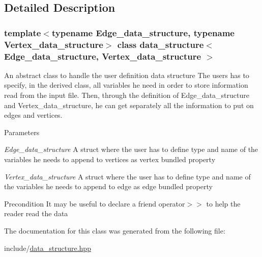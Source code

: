 \subsection{Detailed Description}
\subsubsection*{template$<$typename Edge\_\-data\_\-structure, typename Vertex\_\-data\_\-structure$>$ class data\_\-structure$<$ Edge\_\-data\_\-structure, Vertex\_\-data\_\-structure $>$}

An abstract class to handle the user definition data structure  The users has to specify, in the derived class, all variables he need in order to store information read from the input file. Then, through the definition of Edge\_\-data\_\-structure and Vertex\_\-data\_\-structure, he can get separately all the information to put on edges and vertices. 
\begin{DoxyParams}{Parameters}
\item[{\em Edge\_\-data\_\-structure}]A struct where the user has to define type and name of the variables he needs to append to vertices as vertex bundled property \item[{\em Vertex\_\-data\_\-structure}]A struct where the user has to define type and name of the variables he needs to append to edge as edge bundled property \end{DoxyParams}
\begin{DoxyPrecond}{Precondition}
It may be useful to declare a friend operator$>$$>$ to help the reader read the data 
\end{DoxyPrecond}


The documentation for this class was generated from the following file:\begin{DoxyCompactItemize}
\item 
include/\hyperlink{data__structure_8hpp}{data\_\-structure.hpp}\end{DoxyCompactItemize}
